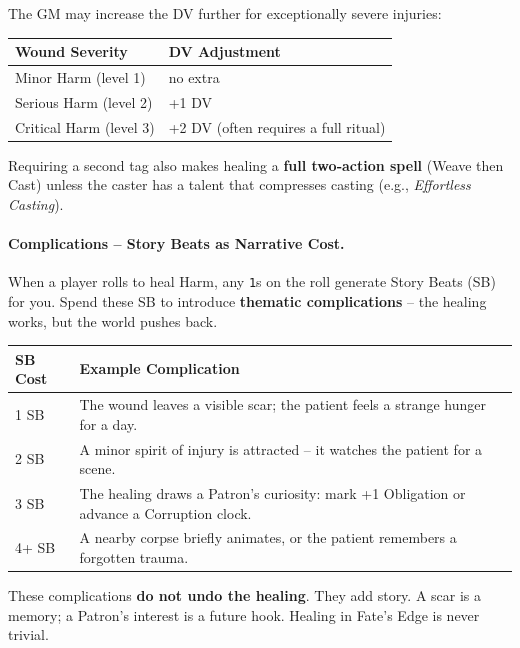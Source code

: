 The GM may increase the DV further for exceptionally severe injuries:
\begin{center}
\begin{tabular}{ll}
\toprule
\textbf{Wound Severity} & \textbf{DV Adjustment} \\
\midrule
Minor Harm (level 1) & no extra \\
Serious Harm (level 2) & +1 DV \\
Critical Harm (level 3) & +2 DV (often requires a full ritual) \\
\bottomrule
\end{tabular}
\end{center}

Requiring a second tag also makes healing a \textbf{full two‑action spell} (Weave then Cast) unless the caster has a talent that compresses casting (e.g., \textit{Effortless Casting}).

\paragraph{Complications – Story Beats as Narrative Cost.}
When a player rolls to heal Harm, any \texttt{1}s on the roll generate Story Beats (SB) for you.  Spend these SB to introduce \textbf{thematic complications} – the healing works, but the world pushes back.

\begin{tcolorbox}[title=Spend SB on Healing Complications, colback=white!97!gray, colframe=black!80!gray]
\begin{tabularx}{\textwidth}{lX}
\toprule
\textbf{SB Cost} & \textbf{Example Complication} \\
\midrule
1 SB & The wound leaves a visible scar; the patient feels a strange hunger for a day. \\
2 SB & A minor spirit of injury is attracted – it watches the patient for a scene. \\
3 SB & The healing draws a Patron’s curiosity: mark +1 Obligation or advance a Corruption clock. \\
4+ SB & A nearby corpse briefly animates, or the patient remembers a forgotten trauma. \\
\bottomrule
\end{tabularx}
\end{tcolorbox}

These complications \textbf{do not undo the healing}.  They add story.  A scar is a memory; a Patron’s interest is a future hook.  Healing in Fate’s Edge is never trivial.


